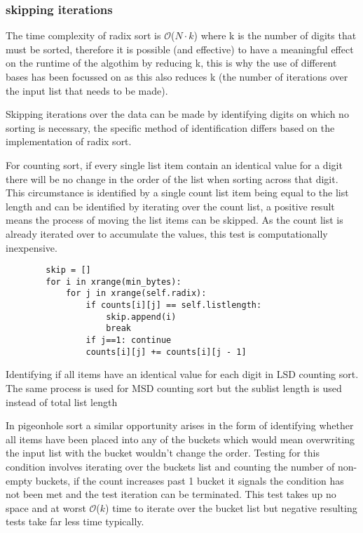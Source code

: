\documentclass[12pt]{article}
\begin{document}
\subsubsection{skipping iterations}
The time complexity of radix sort is $\mathcal{O}${($N \cdot k$)} where k is the number of digits that must be sorted, therefore it is possible (and effective) to have a meaningful effect on the runtime of the algothim by reducing k, this is why the use of different bases has been focussed on as this also reduces k (the number of iterations over the input list that needs to be made).
\par
Skipping iterations over the data can be made by identifying digits on which no sorting is necessary, the specific method of identification differs based on the implementation of radix sort.
\par
For counting sort, if every single list item contain an identical value for a digit there will be no change in the order of the list when sorting across that digit. This circumstance is identified by a single count list item being equal to the list length and can be identified by iterating over the count list, a positive result means the process of moving the list items can be skipped. As the count list is already iterated over to accumulate the values, this test is computationally inexpensive.
\begin{table}[H]
	\centering
	\begin{lstlisting}
		skip = []
		for i in xrange(min_bytes):
			for j in xrange(self.radix):
				if counts[i][j] == self.listlength:
					skip.append(i)
					break
				if j==1: continue
				counts[i][j] += counts[i][j - 1]
	\end{lstlisting}
	\caption*{Identifying if all items have an identical value for each digit in LSD counting sort. \\ The same process is used for MSD counting sort but the sublist length is used instead of total list length}
\end{table}
\par
In pigeonhole sort a similar opportunity arises in the form of identifying whether all items have been placed into any of the buckets which would mean overwriting the input list with the bucket wouldn't change the order. Testing for this condition involves iterating over the buckets list and counting the number of non-empty buckets, if the count increases past 1 bucket it signals the condition has not been met and the test iteration can be terminated. This test takes up no space and at worst $\mathcal{O}${($k$)} time to iterate over the bucket list but negative resulting tests take far less time typically.
\end{document}
